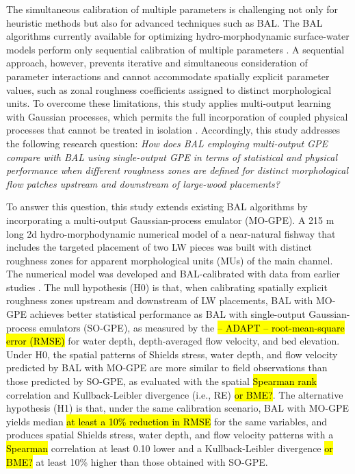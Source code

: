 \documentclass[draft,linenumbers,onecolumn]{agujournal2019} %
\begin{document}
The simultaneous calibration of multiple parameters is challenging not only for heuristic methods but also for advanced techniques such as BAL. The BAL algorithms currently available for optimizing hydro-morphodynamic surface-water models perform only sequential calibration of multiple parameters \cite{mouris2023stability,schwindt2023bayesian}. A sequential approach, however, prevents iterative and simultaneous consideration of parameter interactions and cannot accommodate spatially explicit parameter values, such as zonal roughness coefficients assigned to distinct morphological units. To overcome these limitations, this study applies multi-output learning with Gaussian processes, which permits the full incorporation of coupled physical processes that cannot be treated in isolation \cite{bonilla2007multitask}. Accordingly, this study addresses the following research question: \textit{How does BAL employing multi-output GPE compare with BAL using single-output GPE in terms of statistical and physical performance when different roughness zones are defined for distinct morphological flow patches upstream and downstream of large-wood placements?}

To answer this question, this study extends existing BAL algorithms by incorporating a multi-output Gaussian-process emulator (MO-GPE). A 215 m long 2d hydro-morphodynamic numerical model of a near-natural fishway that includes the targeted placement of two LW pieces was built with distinct roughness zones for apparent morphological units (MUs) of the main channel. The numerical model was developed and BAL-calibrated with data from earlier studies \cite{schwindt2023fuzzylogic, schalko2024flow, scolari2025hydromorphodynamic}. The null hypothesis (H0) is that, when calibrating spatially explicit roughness zones upstream and downstream of LW placements, BAL with MO-GPE achieves better statistical performance as BAL with single-output Gaussian-process emulators (SO-GPE), as measured by the \hl{-- ADAPT -- root-mean-square error (RMSE)} for water depth, depth-averaged flow velocity, and bed elevation. Under H0, the spatial patterns of Shields stress, water depth, and flow velocity predicted by BAL with MO-GPE are more similar to field observations than those predicted by SO-GPE, as evaluated with the spatial \hl{Spearman rank} correlation and Kullback-Leibler divergence (i.e., RE) \hl{or BME?}. The alternative hypothesis (H1) is that, under the same calibration scenario, BAL with MO-GPE yields median \hl{at least a 10\% reduction in RMSE} for the same variables, and produces spatial Shields stress, water depth, and flow velocity patterns with a \hl{Spearman} correlation at least 0.10 lower and a Kullback-Leibler divergence \hl{or BME?} at least 10\% higher than those obtained with SO-GPE.
\end{document}
